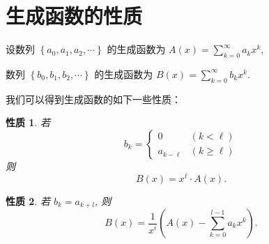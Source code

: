 \documentclass[punct]{ctexbeamer}
\newtheorem{pr}{性质}
\def\pf{\noindent {\bf 证明\ }}
\begin{document}
\section{生成函数的性质}
%
%
%

\begin{frame}
   	设数列 $\left\{a_{0}, a_{1}, a_{2}, \cdots\right\}$ 的生成函数为 $A(x)=\sum_{k=0}^{\infty} a_{k} x^{k}$,

  \quad 数列 $\left\{b_{0}, b_{1}, b_{2}, \cdots\right\}$
   的生成函数为 $B(x)=\sum_{k=0}^{\infty} b_{k} x^{k}$.

     我们可以得到生成函数的如下一些性质：

	\begin{pr}
		若
		$$
		b_{k}=\left\{\begin{array}{ll}
		0 & (k<\ell) \\ a_{k-\ell} & (k \geqslant \ell)
		\end{array}\right.
		$$
		则
		$$
		B(x)=x^{\ell} \cdot A(x).
		$$
	\end{pr}


\begin{pr}
	若 $b_{k}=a_{k+l}$, 则
	$$
	B(x)=\frac{1}{x^{i}}\left(A(x)-\sum_{k=0}^{l-1} a_{k} x^{k}\right).
	$$
\end{pr}
\end{frame}
\end{document}

